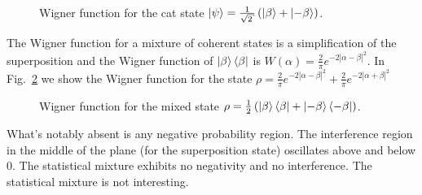 \begin{homeworkProblem}
\begin{figure}[ht]
    \centering
    
    \caption{Wigner function for the cat state $ \ket{\psi} = \frac{1}{\sqrt{2}}
    \left( \ket{\beta} + \ket{-\beta} \right)$.}
    \label{fig:Problem5a}
\end{figure}

The Wigner function for a mixture of coherent states is a simplification of the
superposition and the Wigner function of $\ket{\beta}\bra{\beta}$
is $ W(\alpha) = \frac{2}{\pi} e^{-2 \left| \alpha - \beta \right|^2} $.
In Fig.~\ref{fig:Problem5b} we show the Wigner function for the state $ \rho =
\frac{2}{\pi} e^{-2 \left| \alpha - \beta \right|^2} + \frac{2}{\pi} e^{-2 \left| \alpha + \beta \right|^2} $
\begin{figure}[ht]
    \centering
    
    \caption{Wigner function for the mixed state $ \rho = \frac{1}{2}
    \left( \ket{\beta}\bra{\beta} + \ket{-\beta}\bra{-\beta} \right)$.}
    \label{fig:Problem5b}
\end{figure}
What's notably absent is any negative probability region. The interference
region in the middle of the plane (for the superposition state) oscillates above
and below 0. The statistical mixture exhibits no negativity and no interference.
The statistical mixture is not interesting.
\end{homeworkProblem}
